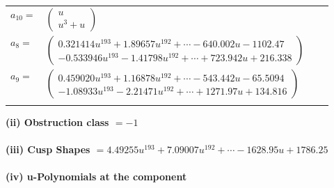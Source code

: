 \documentclass[1p]{elsarticle_modified}
\theoremstyle{definition}
\begin{document}
\begin{tabular}{m{7pt} m{180pt} m{7pt} m{180pt} }
\flushright $a_{10}=$&$\begin{pmatrix}u\\u^3+u\end{pmatrix}$ \\
\flushright $a_{8}=$&$\begin{pmatrix}0.321414 u^{193}+1.89657 u^{192}+\cdots-640.002 u-1102.47\\-0.533946 u^{193}-1.41798 u^{192}+\cdots+723.942 u+216.338\end{pmatrix}$ \\
\flushright $a_{9}=$&$\begin{pmatrix}0.459020 u^{193}+1.16878 u^{192}+\cdots-543.442 u-65.5094\\-1.08933 u^{193}-2.21471 u^{192}+\cdots+1271.97 u+134.816\end{pmatrix}$\\&\end{tabular}
\flushleft \textbf{(ii) Obstruction class $= -1$}\\~\\
\flushleft \textbf{(iii) Cusp Shapes $= 4.49255 u^{193}+7.09007 u^{192}+\cdots-1628.95 u+1786.25$}\\~\\
\newpage\renewcommand{\arraystretch}{1}
\flushleft \textbf{(iv) u-Polynomials at the component}\newline \\
\end{document}
